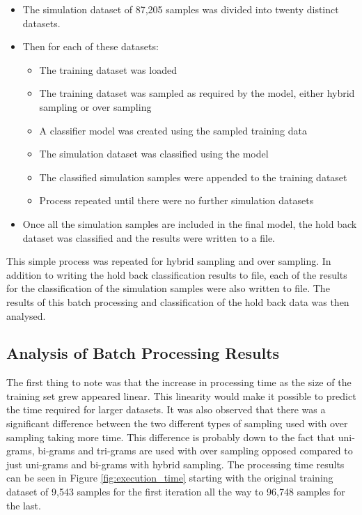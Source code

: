 \begin{itemize}

	\item The simulation dataset of 87,205 samples was divided into twenty distinct datasets.
	\item Then for each of these datasets:
	
	\begin{itemize}
	
		\item The training dataset was loaded
		\item The training dataset was sampled as required by the model, either hybrid sampling or over sampling
		\item A classifier model was created using the sampled training data
		\item The simulation dataset was classified using the model
		\item The classified simulation samples were appended to the training dataset
		\item Process repeated until there were no further simulation datasets 
	
	\end{itemize}
	
	\item Once all the simulation samples are included in the final model, the hold back dataset was classified and the results were written to a file.

\end{itemize}

This simple process was repeated for hybrid sampling and over sampling. In addition to writing the hold back classification results to file, each of the results for the classification of the simulation samples were also written to file. The results of this batch processing and classification of the hold back data was then analysed.

\subsection{Analysis of Batch Processing Results}
The first thing to note was that the increase in processing time as the size of the training set grew appeared linear. This linearity would make it possible to predict the time required for larger datasets. It was also observed that there was a significant difference between the two different types of sampling used with over sampling taking more time. This difference is probably down to the fact that uni-grams, bi-grams and tri-grams are used with over sampling opposed compared to just uni-grams and bi-grams with hybrid sampling. The processing time results can be seen in Figure \ref{fig:execution_time} starting with the original training dataset of 9,543 samples for the first iteration all the way to 96,748 samples for the last.

